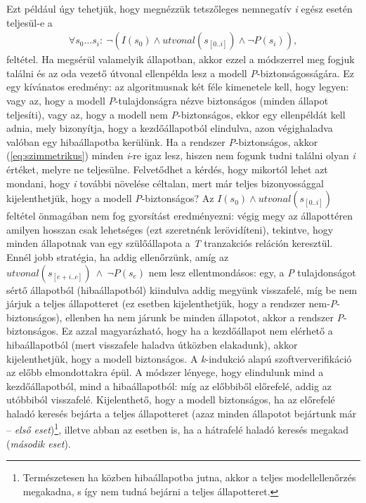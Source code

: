 Ezt például úgy tehetjük, hogy megnézzük tetszőleges nemnegatív \emph{i} egész esetén teljesül-e a
\begin{align}
	\label{eq:szimmetrikus}
	\forall s_{0} \dots s_{i}:~\neg(I(s_{0}) \wedge \mathit{utvonal}(s_{[0..i]}) \wedge \neg P(s_{i})),
\end{align}
feltétel. Ha megsérül valamelyik állapotban, akkor ezzel a módszerrel meg fogjuk találni és az oda vezető útvonal ellenpélda lesz a modell \emph{P}-biztonságosságára. Ez egy kívánatos eredmény: az algoritmusnak két féle kimenetele kell, hogy legyen: vagy az, hogy a modell \emph{P}-tulajdonságra nézve biztonságos (minden állapot teljesíti), vagy az, hogy a modell nem \emph{P}-biztonságos, ekkor egy ellenpéldát kell adnia, mely bizonyítja, hogy a  kezdőállapotból elindulva, azon végighaladva valóban egy hibaállapotba kerülünk.
\newline
\newline
Ha a rendszer \emph{P}-biztonságos, akkor (\ref{eq:szimmetrikus}) minden \emph{i}-re igaz lesz, hiszen nem fogunk tudni találni olyan \emph{i} értéket, melyre ne teljesülne. Felvetődhet a kérdés, hogy mikortól lehet azt mondani, hogy \emph{i} további növelése céltalan, mert már teljes bizonyossággal kijelenthetjük, hogy a modell \emph{P}-biztonságos? Az $I(s_{0}) \wedge \mathit{utvonal}(s_{[0..i]})$ feltétel önmagában nem fog gyorsítást eredményezni: végig megy az állapottéren amilyen hosszan csak lehetséges (ezt szeretnénk lerövidíteni), tekintve, hogy minden állapotnak van egy szülőállapota a \emph{T} tranzakciós reláción keresztül.
\newline
\newline
Ennél jobb stratégia, ha addig ellenőrzünk, amíg az $\mathit{utvonal}(s_{[e+i..e]})~\wedge~\neg P(s_{e})$ nem lesz ellentmondásos: egy, a \emph{P} tulajdonságot sértő állapotból (hibaállapotból) kiindulva addig megyünk visszafelé, míg be nem járjuk a teljes állapotteret (ez esetben kijelenthetjük, hogy a rendszer nem-\emph{P}-biztonságos), ellenben ha nem járunk be minden állapotot, akkor a rendszer \emph{P}-biztonságos. Ez azzal magyarázható, hogy ha a kezdőállapot nem elérhető a hibaállapotból (mert visszafele haladva útközben elakadunk), akkor kijelenthetjük, hogy a modell biztonságos.
\newline
\newline
A \emph{k}-indukció alapú szoftververifikáció az előbb elmondottakra épül. A módszer lényege, hogy elindulunk mind a kezdőállapotból, mind a hibaállapotból: míg az előbbiből előrefelé, addig az utóbbiból visszafelé. Kijelenthető, hogy a modell biztonságos, ha az előrefelé haladó keresés bejárta a teljes állapotteret (azaz minden állapotot bejártunk már  -- \emph{első eset})\footnote{Természetesen ha közben hibaállapotba jutna, akkor a teljes modellellenőrzés megakadna, s így nem tudná bejárni a teljes állapotteret.}, illetve abban az esetben is, ha a hátrafelé haladó keresés megakad (\emph{második eset}).
